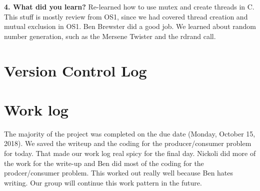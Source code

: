 \documentclass[10pt,english]{article}
\begin{document}
\noindent \textbf{4. What did you learn?}
Re-learned how to use mutex and create threads in C. This stuff is mostly review from OS1, since we had covered thread creation and mutual exclusion in OS1. Ben Brewster did a good job. We learned about random number generation, such as the Mersene Twister and the rdrand call.\\


\section{Version Control Log}



\section{Work log}


The majority of the project was completed on the due date (Monday, October 15, 2018). We saved the writeup and the coding for the producer/consumer problem for today. That made our work log real spicy for the final day. Nickoli did more of the work for the write-up and Ben did most of the coding for the prodcer/consumer problem. This worked out really well because Ben hates writing. Our group will continue this work pattern in the future. 
\end{document}
